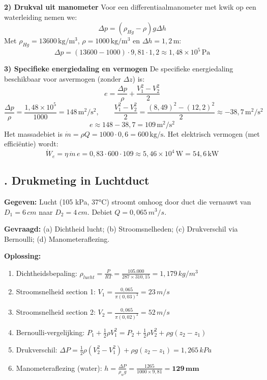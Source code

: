 \documentclass[a4paper,11pt,twoside]{report}
\newcounter{opgave}[section]
\newcommand{\opgave}[1]{%
    \refstepcounter{opgave}%
    \subsection*{\textbf{\arabic{opgave}.} #1}%
}
\begin{document}
	\textbf{2) Drukval uit manometer}
Voor een differentiaalmanometer met kwik op een waterleiding nemen we:
\[
\Delta p=(\rho_{Hg}-\rho)g\Delta h
\]
Met $\rho_{Hg}=13600\,\mathrm{kg/m^3}$, $\rho=1000\,\mathrm{kg/m^3}$ en $\Delta h=1{,}2\,\mathrm{m}$:
\[
\Delta p=(13600-1000)\cdot 9{,}81\cdot 1{,}2 \approx 1{,}48\times 10^5\,\mathrm{Pa}
\]

	\textbf{3) Specifieke energiedaling en vermogen}
De specifieke energiedaling beschikbaar voor asvermogen (zonder $\Delta z$) is:
\[
e = \frac{\Delta p}{\rho}+\frac{V_1^2-V_2^2}{2}
\]
\[
\frac{\Delta p}{\rho}=\frac{1{,}48\times 10^5}{1000}=148\,\mathrm{m^2/s^2},\qquad \frac{V_1^2-V_2^2}{2}=\frac{(8{,}49)^2-(12{,}2)^2}{2}\approx -38{,}7\,\mathrm{m^2/s^2}
\]
\[
e\approx 148-38{,}7=109\,\mathrm{m^2/s^2}
\]
Het massadebiet is $\dot{m}=\rho Q=1000\cdot 0{,}6=600\,\mathrm{kg/s}$.
Het elektrisch vermogen (met efficiëntie) wordt:
\[
\dot{W}_e=\eta\,\dot{m}\,e=0{,}83\cdot 600\cdot 109 \approx 5{,}46\times 10^4\,\mathrm{W}=54{,}6\,\mathrm{kW}
\]

\opgave{Drukmeting in Luchtduct}
\textbf{Gegeven:}
Lucht (105 kPa, 37°C) stroomt omhoog door duct die vernauwt van $D_1 = 6 \, cm$ naar $D_2 = 4 \, cm$. Debiet $Q = 0{,}065 \, m^3/s$.

\textbf{Gevraagd:}
(a) Dichtheid lucht; (b) Stroomsnelheden; (c) Drukverschil via Bernoulli; (d) Manometeraflezing.

\textbf{Oplossing:}
\begin{enumerate}
    \item Dichtheidsbepaling: $\rho_{lucht} = \frac{P}{RT} = \frac{105.000}{287 \times 310{,}15} = 1{,}179 \, kg/m^3$
    \item Stroomsnelheid section 1: $V_1 = \frac{0{,}065}{\pi (0{,}03)^2} = 23 \, m/s$
    \item Stroomsnelheid section 2: $V_2 = \frac{0{,}065}{\pi (0{,}02)^2} = 52 \, m/s$
    \item Bernoulli-vergelijking: $P_1 + \frac{1}{2}\rho V_1^2 = P_2 + \frac{1}{2}\rho V_2^2 + \rho g (z_2 - z_1)$
    \item Drukverschil: $\Delta P = \frac{1}{2}\rho (V_2^2 - V_1^2) + \rho g (z_2 - z_1) = 1{,}265 \, kPa$
    \item Manometeraflezing (water): $h = \frac{\Delta P}{\rho_w g} = \frac{1265}{1000 \times 9{,}81} = \mathbf{129 \, mm}$
\end{enumerate}

\end{document}
